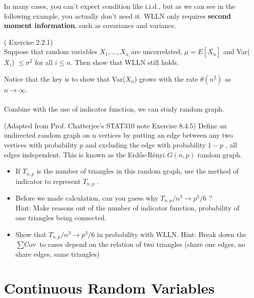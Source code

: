 In many cases, you can't expect condition like i.i.d., but as we can see in the following example, you actually don't need it. WLLN only requires \textbf{second moment information}, such as covariance and variance.  
\begin{eg}
    (\cite{IntroPanchenko} Exercise 2.2.1) \\ 
    Suppose that random variables \(X_1, \dots, X_n\) are uncorrelated, \(\mu  = E[\bar{X_n}]\) and Var(\(X_{i} \)) \(\leq \sigma^2\) for all \(i \leq n\). 
    Then show that WLLN still holds.     
\end{eg}
Notice that the key is to show that Var(\(X_n\)) grows with the rate \(\theta(n^2)\) as \(n \to \infty \). 
\\
\\
Combine with the use of indicator function, we can study random graph. 
\begin{eg}
    (Adapted from Prof. Chatterjee's STAT310 note Exercise 8.4.5)
    Define an undirected random graph on n vertices by putting an edge between any two vertices with probability \(p\)  and excluding the edge with probability \(1-p\) , all edges independent.
    This is known as the Erdős-Rényi \(G(n,p)\) random graph. 
    \begin{itemize}
        \item If \(T_{n,p}\) is the number of triangles in this random graph, use the method of indicator to represent \(T_{n,p}\) . 
        \item Before we made calculation, can you guess why \(T_{n,p} / n^3 \to p^3 /6\) ? \\
            Hint: Make reasons out of the number of indicator function, probability of one triangles being connected. 
        \item Show that \(T_{n,p} / n^3 \to p^3 / 6 \) in probability with WLLN. 
            Hint: Break down the \(\sum \text{Cov} \) to cases depend on the relation of two triangles (share one edges, no share edges, same triangles)
    \end{itemize} 
\end{eg}

\section{Continuous Random Variables}

